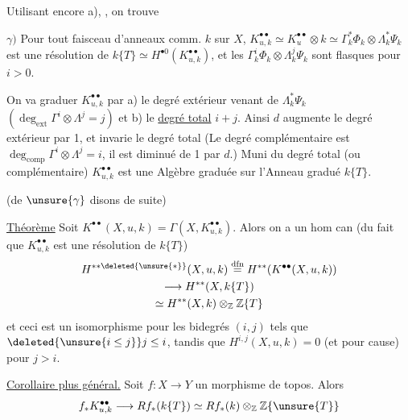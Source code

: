 Utilisant encore a), , on trouve

$\gamma)$ Pour tout faisceau d'anneaux comm. $k$ sur $X$,
$K_{u,k}^{\bullet\bullet}\simeq K_u^{\bullet\bullet}\otimes k
\simeq\Gamma_k^*\Phi_k\otimes\Lambda_k^*\Psi_k$ est une résolution de
$k\{T\}\simeq H^{\bullet0}(K_{u,k}^{\bullet\bullet})$, et les
$\Gamma_k^i\Phi_k\otimes\Lambda_k^j\Psi_k$ sont flasques pour $i>0$.

On va graduer $K_{u,k}^{\bullet\bullet}$ par a) le degré extérieur venant de
$\Lambda_k^*\Psi_k$ $(\deg_{\mathrm{ext}}\Gamma^i\otimes\Lambda^j=j)$
et b) le \uline{degré total} $i+j$. Ainsi $d$ augmente le degré extérieur par 1,
et invarie le degré total 
(Le degré complémentaire est $\deg_{\mathrm{comp}}\Gamma^i\otimes\Lambda^j=i$,
il est diminué de 1 par $d$.) Muni du degré total (ou complémentaire)
$K_{u,k}^{\bullet\bullet}$ est une Algèbre graduée sur l'Anneau gradué $k\{T\}$.

 (de $\unsure{\gamma}$ disons de suite)

\uline{Théorème} Soit
$K^{\bullet\bullet}(X,u,k)=\Gamma(X,K_{u,k}^{\bullet\bullet})$.
Alors on a un hom can (du fait que $K_{u,k}^{\bullet\bullet}$
 est une résolution de $k\{T\}$)
\[
\begin{gathered}
H^{**\deleted{\unsure{*}}}(X,u,k)\overset{\mathrm{dfn}}=
H^{**}(K^{\bullet\bullet}(X,u,k))\\
\longrightarrow H^{**}(X,k\{T\})\\
\simeq H^{**}(X,k)\otimes_{\mathbb Z}\mathbb Z\{T\}
\end{gathered}
\]
et ceci est un isomorphisme pour les bidegrés $(i,j)$ tels que
$\deleted{\unsure{i\leq j}}j\leq i$, tandis que
$H^{i,j}(X,u,k)=0$ (et pour cause) pour $j>i$.


\uline{Corollaire plus général.} Soit $f:X\longrightarrow Y$ un morphisme de topos. Alors
\[
f_*K_{u,k}^{\bullet\bullet}\longrightarrow Rf_*(k\{T\})
\simeq Rf_*(k)\otimes_{\mathbb Z}\mathbb Z\{\unsure{T}\}
\]

